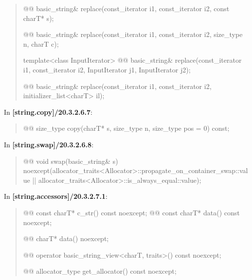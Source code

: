 \documentclass{wg21}
\begin{document}
\begin{quote}
\begin{itemdecl}
@@ basic_string& replace(const_iterator i1, const_iterator i2, const charT* s);
\end{itemdecl}

\begin{itemdecl}
@@ basic_string& replace(const_iterator i1, const_iterator i2, size_type n, charT c);
\end{itemdecl}

\begin{itemdecl}
template<class InputIterator>
  @@
  basic_string& replace(const_iterator i1, const_iterator i2, InputIterator j1, InputIterator j2);
\end{itemdecl}

\begin{itemdecl}
@@ basic_string& replace(const_iterator i1, const_iterator i2, initializer_list<charT> il);
\end{itemdecl}
\end{quote}

In \textbf{[string.copy]/20.3.2.6.7}:
\begin{quote}
\begin{itemdecl}
@@ size_type copy(charT* s, size_type n, size_type pos = 0) const;
\end{itemdecl}
\end{quote}

In \textbf{[string.swap]/20.3.2.6.8}:
\begin{quote}
\begin{itemdecl}
@@
void swap(basic_string& s)
  noexcept(allocator_traits<Allocator>::propagate_on_container_swap::value ||
           allocator_traits<Allocator>::is_always_equal::value);
\end{itemdecl}
\end{quote}


In \textbf{[string.accessors]/20.3.2.7.1}:
\begin{quote}
\begin{itemdecl}
@@ const charT* c_str() const noexcept;
@@ const charT* data() const noexcept;
\end{itemdecl}

\begin{itemdecl}
@@ charT* data() noexcept;
\end{itemdecl}

\begin{itemdecl}
@@ operator basic_string_view<charT, traits>() const noexcept;
\end{itemdecl}

\begin{itemdecl}
@@ allocator_type get_allocator() const noexcept;
\end{itemdecl}
\end{quote}
\end{document}

